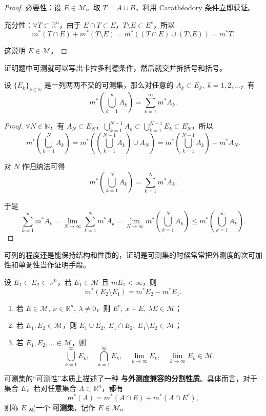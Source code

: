 \documentclass[lang=cn,10pt]{elegantbook}
\begin{document}
\begin{proof}
必要性：设 $E \in \mathcal{M}$。取 $T = A \cup B$，利用 Carathéodory 条件立即获证。

充分性：$\forall T \subset \mathbb{R}^n$，由于 $E \cap T \subset E$，$T \setminus E \subset E^c$，所以
\[
m^*(T \cap E) + m^*(T \setminus E) = m^*((T \cap E) \cup (T \setminus E)) = m^* T.
\]

这说明 $E \in \mathcal{M}$。
\end{proof}
证明题中可测就可以写出卡拉多利德条件，然后就交并拆括号和括号。
\begin{theorem}[测度的可列可加性]
设 $\{E_k\}_{k \in \mathbb{N}}$ 是一列两两不交的可测集，那么对任意的 $A_k \subset E_k, \; k = 1, 2, \dots$，有
\[
m^*\left( \bigcup_{k=1}^{\infty} A_k \right) = \sum_{k=1}^{\infty} m^* A_k.
\]
\end{theorem}

\begin{proof}
$\forall N \in \mathbb{N}$，有 $A_N \subset E_N$，$\bigcup_{k=1}^{N-1} A_k \subset \bigcup_{k=1}^{N-1} E_k \subset E_N^c$，所以
\[
m^*\left( \bigcup_{k=1}^{N} A_k \right) = m^*\left( \left( \bigcup_{k=1}^{N-1} A_k \right) \cup A_N \right) = m^*\left( \bigcup_{k=1}^{N-1} A_k \right) + m^* A_N.
\]

对 $N$ 作归纳法可得
\[
m^*\left( \bigcup_{k=1}^{N} A_k \right) = \sum_{k=1}^{N} m^* A_k.
\]

于是
\[
\sum_{k=1}^{\infty} m^* A_k = \lim_{N \to \infty} \sum_{k=1}^{N} m^* A_k = \lim_{N \to \infty} m^*\left( \bigcup_{k=1}^{N} A_k \right) \leq m^*\left( \bigcup_{k=1}^{\infty} A_k \right).
\]
\end{proof}
可列的程度还是能保持结构和性质的，证明是可测集的时候常常把外测度的次可加性和单调性当作证明手段。
\begin{theorem}[可测集的可减性]
设 $E_1 \subset E_2 \subset \mathbb{R}^n$，若 $E_1 \in \mathcal{M}$ 且 $m E_1 < \infty$，则
\[
m^*(E_2 \setminus E_1) = m^* E_2 - m^* E_1.
\]
\end{theorem}
\begin{theorem}[可测对集合运算的封闭性]
\begin{enumerate}
  \item 若 $E \in \mathcal{M},\ x \in \mathbb{R}^n,\ \lambda \neq 0$，则 $E^c,\ x + E,\ \lambda E \in \mathcal{M}$；
  
  \item 若 $E_1, E_2 \in \mathcal{M}$，则 $E_1 \cup E_2,\ E_1 \cap E_2,\ E_1 \setminus E_2 \in \mathcal{M}$；
  
  \item 若 $E_1, E_2, \dots \in \mathcal{M}$，则
  \[
  \bigcup_{k=1}^{\infty} E_k,\quad \bigcap_{k=1}^{\infty} E_k,\quad \lim_{k \to \infty} E_k,\quad \overline{\lim_{k \to \infty}} E_k \in \mathcal{M}.
  \]
\end{enumerate}
\end{theorem}
可测集的“可测性”本质上描述了一种 \textbf{与外测度兼容的分割性质}。具体而言，对于集合 $E$，若对任意集合 $A \subset \mathbb{R}^n$，都有
\[
m^*(A) = m^*(A \cap E) + m^*(A \cap E^c),
\]
则称 $E$ 是一个 \textbf{可测集}，记作 $E \in \mathcal{M}$。
\end{document}
